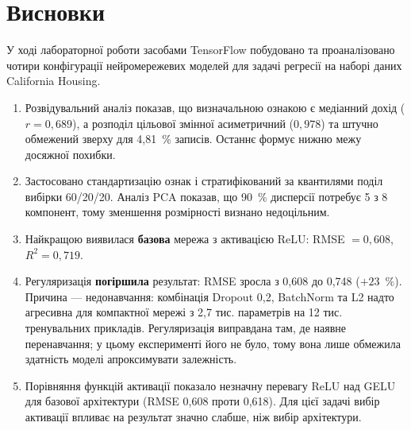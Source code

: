 \documentclass[14pt,a4paper]{extreport}
\begin{document}
\section{Висновки}

У ході лабораторної роботи засобами TensorFlow побудовано та проаналізовано чотири конфігурації нейромережевих моделей для задачі регресії на наборі даних California Housing.

\begin{enumerate}
\item Розвідувальний аналіз показав, що визначальною ознакою є медіанний дохід ($r = 0{,}689$), а розподіл цільової змінної асиметричний ($0{,}978$) та штучно обмежений зверху для 4,81~\% записів. Останнє формує нижню межу досяжної похибки.

\item Застосовано стандартизацію ознак і стратифікований за квантилями поділ вибірки 60/20/20. Аналіз PCA показав, що 90~\% дисперсії потребує 5 з 8 компонент, тому зменшення розмірності визнано недоцільним.

\item Найкращою виявилася \textbf{базова} мережа з активацією ReLU: RMSE $= 0{,}608$, $R^2 = 0{,}719$.

\item Регуляризація \textbf{погіршила} результат: RMSE зросла з 0,608 до 0,748 ($+23$~\%). Причина --- недонавчання: комбінація Dropout 0,2, BatchNorm та L2 надто агресивна для компактної мережі з 2,7 тис. параметрів на 12 тис. тренувальних прикладів. Регуляризація виправдана там, де наявне перенавчання; у цьому експерименті його не було, тому вона лише обмежила здатність моделі апроксимувати залежність.

\item Порівняння функцій активації показало незначну перевагу ReLU над GELU для базової архітектури (RMSE 0,608 проти 0,618). Для цієї задачі вибір активації впливає на результат значно слабше, ніж вибір архітектури.
\end{enumerate}
\end{document}
